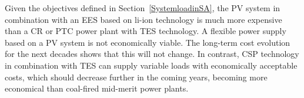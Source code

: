 Given the objectives defined in Section~\ref{SystemloadinSA}, the \ac{PV} system in combination with an \ac{EES} based on \ac{li-ion} technology is much more expensive than a \ac{CR} or \ac{PTC} power plant with \ac{TES} technology. A flexible power supply based on a \ac{PV} system is not economically viable. The long-term cost evolution for the next decades shows that this will not change. In contrast, \ac{CSP} technology in combination with \ac{TES} can supply variable loads with economically acceptable costs, which should decrease further in the coming years, becoming more economical than coal-fired mid-merit power plants.